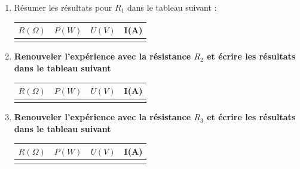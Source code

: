 \documentclass[11pt,a4paper]{article}
\begin{document}
\begin{enumerate}[label*=1.\arabic*.]
\item Résumer les résultats pour $R_1$ dans le tableau suivant : 

\begin{center}
    

    \begin{tabular}{|C{3cm}|C{3cm}|C{3cm}|C{3cm}|}
         \hline
         $R(\Omega)$ & $P(W)$ &  $U(V)$ & I(A) \\

         \hline
           &  &  &  \\
         \hline
 
    \end{tabular}
\end{center}




 
\vfill

\newpage 

\item \textbf{Renouveler l'expérience avec la résistance $R_2$ et écrire les résultats dans le tableau suivant} 


\begin{center}
    

    \begin{tabular}{|C{3cm}|C{3cm}|C{3cm}|C{3cm}|}
         \hline
         $R(\Omega)$ & $P(W)$ &  $U(V)$ & I(A) \\

         \hline
           &  &  &  \\
         \hline
 
    \end{tabular}
\end{center}



\item \textbf{Renouveler l'expérience avec la résistance $R_3$ et écrire les résultats dans le tableau suivant} 

\begin{center}
    

    \begin{tabular}{|C{3cm}|C{3cm}|C{3cm}|C{3cm}|}
         \hline
         $R(\Omega)$ & $P(W)$ &  $U(V)$ & I(A) \\

         \hline
           &  &  &  \\
         \hline
 
    \end{tabular}
\end{center}




\end{enumerate}
\end{document}
